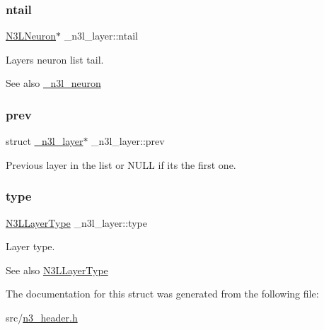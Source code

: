 \subsubsection{\texorpdfstring{ntail}{ntail}}
{\footnotesize\ttfamily \hyperlink{n3__header_8h_a621b1df037f351bd3542298933e5799a}{N3\+L\+Neuron}$\ast$ \+\_\+n3l\+\_\+layer\+::ntail}

Layer\textquotesingle{}s neuron list tail. \begin{DoxySeeAlso}{See also}
\hyperlink{struct__n3l__neuron}{\+\_\+n3l\+\_\+neuron} 
\end{DoxySeeAlso}
\mbox{\label{struct__n3l__layer_aedfd507c2c60e3b64234b8cd8570e6c9}} 
\subsubsection{\texorpdfstring{prev}{prev}}
{\footnotesize\ttfamily struct \hyperlink{struct__n3l__layer}{\+\_\+n3l\+\_\+layer}$\ast$ \+\_\+n3l\+\_\+layer\+::prev}

Previous layer in the list or N\+U\+LL if it\textquotesingle{}s the first one. \mbox{\label{struct__n3l__layer_aec180f7f12ea86bb622c364076dbf1f6}} 
\subsubsection{\texorpdfstring{type}{type}}
{\footnotesize\ttfamily \hyperlink{n3__header_8h_a1040baea07fec4d26d25641f75e892c5}{N3\+L\+Layer\+Type} \+\_\+n3l\+\_\+layer\+::type}

Layer type. \begin{DoxySeeAlso}{See also}
\hyperlink{n3__header_8h_a1040baea07fec4d26d25641f75e892c5}{N3\+L\+Layer\+Type} 
\end{DoxySeeAlso}


The documentation for this struct was generated from the following file\+:\begin{DoxyCompactItemize}
\item 
src/\hyperlink{n3__header_8h}{n3\+\_\+header.\+h}\end{DoxyCompactItemize}
